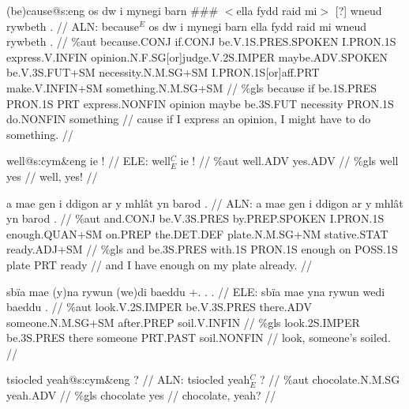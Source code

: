 \documentclass[a4paper,10pt]{article}
\begin{document}
\ex
\begingl[lingstyle=gergl]
\glchat (be)cause@s:eng os dw i mynegi barn \#\#\# $<$ella fydd raid mi$>$ [?] wneud rywbeth . //
\glsurface ALN:  because$^{E}$ os dw i mynegi barn ella fydd raid mi wneud rywbeth .  //
\glauto \%aut  because{\scriptsize .CONJ} if{\scriptsize .CONJ} be{\scriptsize .V.1S.PRES.SPOKEN} I{\scriptsize .PRON.1S} express{\scriptsize .V.INFIN} opinion{\scriptsize .N.F.SG[or]judge.V.2S.IMPER} maybe{\scriptsize .ADV.SPOKEN} be{\scriptsize .V.3S.FUT+SM} necessity{\scriptsize .N.M.SG+SM} I{\scriptsize .PRON.1S[or]aff.PRT} make{\scriptsize .V.INFIN+SM} something{\scriptsize .N.M.SG+SM}   //
\glmanual \%gls  because if be{\scriptsize .1S.PRES} PRON{\scriptsize .1S} PRT express{\scriptsize .NONFIN} opinion maybe be{\scriptsize .3S.FUT} necessity PRON{\scriptsize .1S} do{\scriptsize .NONFIN} something  //
\gleng cause if I express an opinion, I might have to do something. //
\endgl
\xe

\ex
\begingl[lingstyle=gergl]
\glchat well@s:cym\&eng ie ! //
\glsurface ELE:  well$^{C}_{E}$ ie !  //
\glauto \%aut  well{\scriptsize .ADV} yes{\scriptsize .ADV}   //
\glmanual \%gls  well yes   //
\gleng well, yes! //
\endgl
\xe

\ex
\begingl[lingstyle=gergl]
\glchat a mae gen i ddigon ar y mhlât yn barod . //
\glsurface ALN:  a mae gen i ddigon ar y mhlât yn barod .  //
\glauto \%aut  and{\scriptsize .CONJ} be{\scriptsize .V.3S.PRES} by{\scriptsize .PREP.SPOKEN} I{\scriptsize .PRON.1S} enough{\scriptsize .QUAN+SM} on{\scriptsize .PREP} the{\scriptsize .DET.DEF} plate{\scriptsize .N.M.SG+NM} stative{\scriptsize .STAT} ready{\scriptsize .ADJ+SM}   //
\glmanual \%gls  and be{\scriptsize .3S.PRES} with{\scriptsize .1S} PRON{\scriptsize .1S} enough on POSS{\scriptsize .1S} plate PRT ready   //
\gleng and I have enough on my plate already. //
\endgl
\xe

\ex
\begingl[lingstyle=gergl]
\glchat sbïa mae (y)na rywun (we)di baeddu +. . . //
\glsurface ELE:  sbïa mae yna rywun wedi baeddu .  //
\glauto \%aut  look{\scriptsize .V.2S.IMPER} be{\scriptsize .V.3S.PRES} there{\scriptsize .ADV} someone{\scriptsize .N.M.SG+SM} after{\scriptsize .PREP} soil{\scriptsize .V.INFIN}   //
\glmanual \%gls  look{\scriptsize .2S.IMPER} be{\scriptsize .3S.PRES} there someone PRT{\scriptsize .PAST} soil{\scriptsize .NONFIN}   //
\gleng look, someone's soiled. //
\endgl
\xe

\ex
\begingl[lingstyle=gergl]
\glchat tsiocled yeah@s:cym\&eng ? //
\glsurface ALN:  tsiocled yeah$^{C}_{E}$ ?  //
\glauto \%aut  chocolate{\scriptsize .N.M.SG} yeah{\scriptsize .ADV}   //
\glmanual \%gls  chocolate yes   //
\gleng chocolate, yeah? //
\endgl
\xe
\end{document}
